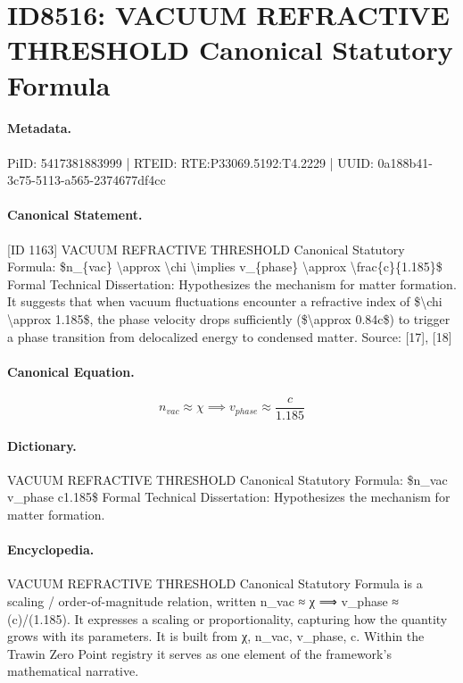 \section*{ID8516: VACUUM REFRACTIVE THRESHOLD Canonical Statutory Formula}
\paragraph{Metadata.}
PiID: 5417381883999 | RTEID: RTE:P33069.5192:T4.2229 | UUID: 0a188b41-3c75-5113-a565-2374677df4cc

\paragraph{Canonical Statement.}
[ID 1163] VACUUM REFRACTIVE THRESHOLD Canonical Statutory Formula: \$n\_\{vac\} \textbackslash{}approx \textbackslash{}chi \textbackslash{}implies v\_\{phase\} \textbackslash{}approx \textbackslash{}frac\{c\}\{1.185\}\$ Formal Technical Dissertation: Hypothesizes the mechanism for matter formation. It suggests that when vacuum fluctuations encounter a refractive index of \$\textbackslash{}chi \textbackslash{}approx 1.185\$, the phase velocity drops sufficiently (\$\textbackslash{}approx 0.84c\$) to trigger a phase transition from delocalized energy to condensed matter. Source: [17], [18]

\paragraph{Canonical Equation.}
\[
n_{vac} \approx \chi \implies v_{phase} \approx \frac{c}{1.185}
\]

\paragraph{Dictionary.}
VACUUM REFRACTIVE THRESHOLD Canonical Statutory Formula: \$n\_vac v\_phase c1.185\$ Formal Technical Dissertation: Hypothesizes the mechanism for matter formation.

\paragraph{Encyclopedia.}
VACUUM REFRACTIVE THRESHOLD Canonical Statutory Formula is a scaling / order-of-magnitude relation, written n\_vac ≈ χ ⟹ v\_phase ≈ (c)/(1.185). It expresses a scaling or proportionality, capturing how the quantity grows with its parameters. It is built from χ, n\_vac, v\_phase, c. Within the Trawin Zero Point registry it serves as one element of the framework's mathematical narrative.
